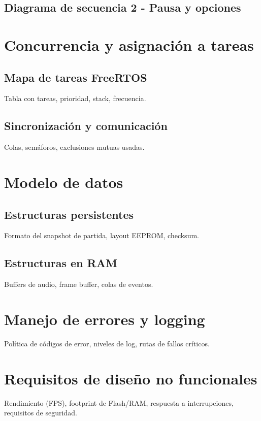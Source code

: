 \documentclass[11pt,a4paper]{article}
\begin{document}
\subsection{Diagrama de secuencia 2 - Pausa y opciones}

\section{Concurrencia y asignación a tareas}
\subsection{Mapa de tareas FreeRTOS}
Tabla con tareas, prioridad, stack, frecuencia.

\subsection{Sincronización y comunicación}
Colas, semáforos, exclusiones mutuas usadas.

\section{Modelo de datos}
\subsection{Estructuras persistentes}
Formato del snapshot de partida, layout EEPROM, checksum.

\subsection{Estructuras en RAM}
Buffers de audio, frame buffer, colas de eventos.

\section{Manejo de errores y logging}
Política de códigos de error, niveles de log, rutas de fallos críticos.

\section{Requisitos de diseño no funcionales}
Rendimiento (FPS), footprint de Flash/RAM, respuesta a interrupciones, requisitos de seguridad.
\end{document}
